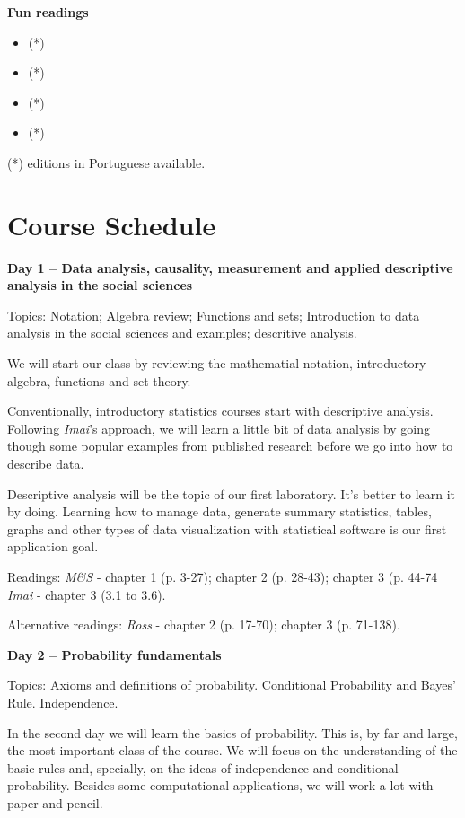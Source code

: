 \documentclass[a4paper,11pt]{article}
\begin{document}
\textbf{Fun readings}

\begin{itemize}
  \item {} (*)
  \item {} (*)
  \item {} (*)
  \item {} (*)
\end{itemize}


(*) editions in Portuguese available.

\pagebreak
\section{Course Schedule}

\textbf{Day 1 -- Data analysis, causality, measurement and applied descriptive analysis in the social sciences}

Topics: Notation; Algebra review; Functions and sets; Introduction to data analysis in the social sciences and examples; descritive analysis.

We will start our class by reviewing the mathematial notation, introductory algebra, functions and set theory.

Conventionally, introductory statistics courses start with descriptive analysis. Following \emph{Imai}'s approach, we will learn a little bit of data analysis by going though some popular examples from published research before we go into how to describe data. 

Descriptive analysis will be the topic of our first laboratory. It's better to learn it by doing. Learning how to manage data, generate summary statistics, tables, graphs and other types of data visualization with statistical software is our first application goal.

Readings: \emph{M\&S} - chapter 1 (p. 3-27); chapter 2 (p. 28-43); chapter 3 (p. 44-74 \emph{Imai} - chapter 3 (3.1 to 3.6).

Alternative readings: \emph{Ross} - chapter 2 (p. 17-70); chapter 3 (p. 71-138).

\textbf{Day 2 -- Probability fundamentals}

Topics: Axioms and definitions of probability. Conditional Probability and Bayes' Rule. Independence.

In the second day we will learn the basics of probability. This is, by far and large, the most important class of the course. We will focus on the understanding of the basic rules and, specially, on the ideas of independence and conditional probability. Besides some computational applications, we will work a lot with paper and pencil.
\end{document}
